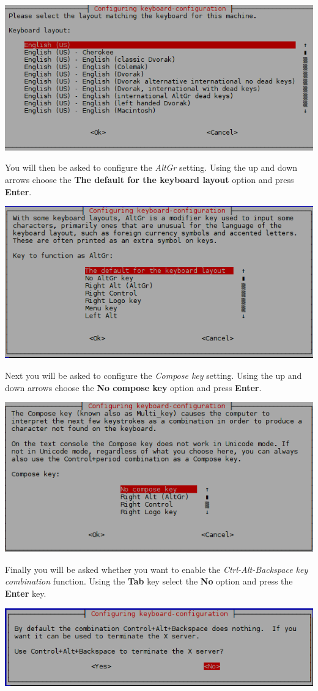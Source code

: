 \begin{enumerate}
\beforefig
\centerline{\includegraphics[height=1.5 in]{pi_images/setup/keyboard_language_choice_english.png}}
\afterfig

You will then be asked to configure the \textit{AltGr} setting. Using the up and down arrows choose the \textbf{The default for the keyboard layout} option and press \textbf{Enter}.

\beforefig
\centerline{\includegraphics[height=1.5 in]{pi_images/setup/keyboard_layout_choice_default_altgr.png}}
\afterfig

Next you will be asked to configure the \textit{Compose key} setting. Using the up and down arrows choose the \textbf{No compose key} option and press \textbf{Enter}.

\beforefig
\centerline{\includegraphics[height=1.5 in]{pi_images/setup/keyboard_layout_default_compose_key.png}}
\afterfig

Finally you will be asked whether you want to enable the \textit{Ctrl-Alt-Backspace key combination} function. Using the \textbf{Tab} key select the \textbf{No} option and press the \textbf{Enter} key.

\beforefig
\centerline{\includegraphics[height=0.75 in]{pi_images/setup/keyboard_layout_default_altctlbksp.png}}
\afterfig


\end{enumerate}

